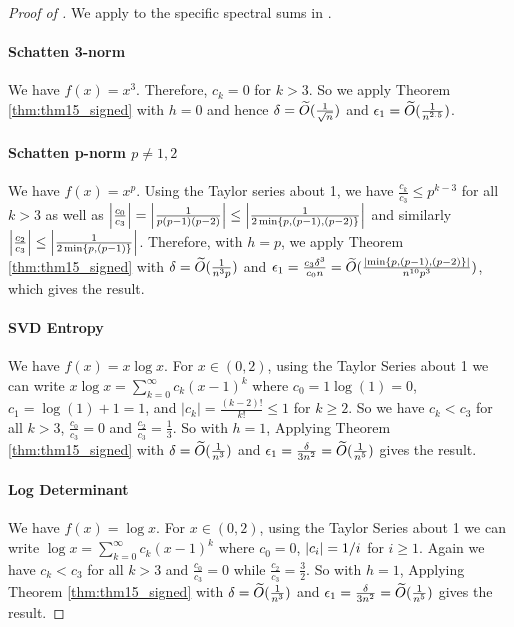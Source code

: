 \begin{proof}[Proof of ]
    We apply  to the specific spectral sums in .
    \paragraph{Schatten 3-norm} We have $f(x) = x^3$. Therefore, $c_k = 0$ for $k > 3$. So we apply Theorem \ref{thm:thm15_signed} with $h = 0$ and hence $\delta = \widetilde{O}( {\frac{1}{\sqrt{n}}} )$ and $\epsilon_1 = \widetilde{O}( {\frac{1}{n^{2.5}}} )$.
    
    \paragraph{Schatten p-norm $p \neq 1, 2$} We have $f(x) = x^p$. Using the Taylor series about 1, we have $\frac{c_k}{c_3} \leq p^{k-3}$ for all $k>3$ as well as $\left| \frac{c_0}{c_3} \right| = \left| \frac{1}{p(p-1)(p-2)} \right| \leq \left| \frac{1}{2 \min \left\{ p, (p-1), (p-2) \right\}} \right|$ and similarly $\left| \frac{c_2}{c_3} \right| \leq \left| \frac{1}{2 \min \left\{ p, (p-1) \right\}} \right|$. Therefore, with $h=p$, we apply Theorem \ref{thm:thm15_signed} with $\delta = \widetilde{O}( {\frac{1}{n^3 p}} )$ and $\epsilon_1 = \frac{c_3 \delta^3}{c_0 n} = \widetilde{O}( {\frac{\left| \min \left\{ p, (p-1), (p-2) \right\} \right|}{n^{10}p^3}} )$, which gives the result.

    \paragraph{SVD Entropy} We have $f(x) = x \log x$. For $x \in (0, 2)$, using the Taylor Series about 1 we can write $x \log x =\sum_{k=0}^\infty c_k(x-1)^k$ where $c_0 = 1 \log(1) = 0$, $c_1 = \log(1) + 1 = 1$, and $|c_k| = \frac{(k-2)!}{k!} \leq 1$ for $k \geq 2$. So we have $c_k < c_3$ for all $k > 3$, $\frac{c_0}{c_3} = 0$ and $\frac{c_2}{c_3} = \frac{1}{3}$. So with $h=1$,  Applying Theorem \ref{thm:thm15_signed} with $\delta = \widetilde{O}( {\frac{1}{n^3}} )$ and $\epsilon_1 = \frac{\delta}{3n^2} = \widetilde{O}( {\frac{1}{n^5}} )$ gives the result.

    \paragraph{Log Determinant} We have $f(x) = \log x$. For $x \in (0, 2)$, using the Taylor Series about 1 we can write $\log x =\sum_{k=0}^\infty c_k(x-1)^k$ where $c_0 = 0$, $\left| c_i \right| = 1/i$ for $i \geq 1$. Again we have $c_k < c_3$ for all $k > 3$ and $\frac{c_0}{c_3} = 0$ while $\frac{c_2}{c_3} = \frac{3}{2}$. So with $h=1$,  Applying Theorem \ref{thm:thm15_signed} with $\delta = \widetilde{O}( {\frac{1}{n^3}} )$ and $\epsilon_1 = \frac{\delta}{3n^2} = \widetilde{O}( {\frac{1}{n^5}} )$ gives the result.


\end{proof}
